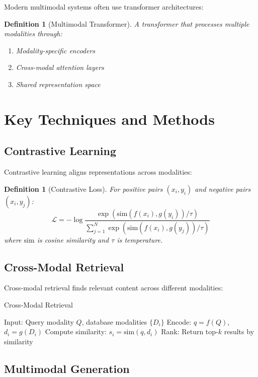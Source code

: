 \documentclass[11pt,a4paper]{article}
\newtheorem{definition}[theorem]{Definition}
\begin{document}
Modern multimodal systems often use transformer architectures:

\begin{definition}[Multimodal Transformer]
A transformer that processes multiple modalities through:
\begin{enumerate}
\item Modality-specific encoders
\item Cross-modal attention layers
\item Shared representation space
\end{enumerate}
\end{definition}

\section{Key Techniques and Methods}

\subsection{Contrastive Learning}

Contrastive learning aligns representations across modalities:

\begin{definition}[Contrastive Loss]
For positive pairs $(x_i, y_i)$ and negative pairs $(x_i, y_j)$:
$$\mathcal{L} = -\log \frac{\exp(\text{sim}(f(x_i), g(y_i))/\tau)}{\sum_{j=1}^N \exp(\text{sim}(f(x_i), g(y_j))/\tau)}$$
where $\text{sim}$ is cosine similarity and $\tau$ is temperature.
\end{definition}

\subsection{Cross-Modal Retrieval}

Cross-modal retrieval finds relevant content across different modalities:

\begin{algorithm}
\caption{Cross-Modal Retrieval}
\begin{algorithmic}[1]
\STATE Input: Query modality $Q$, database modalities $\{D_i\}$
\STATE Encode: $q = f(Q)$, $d_i = g(D_i)$
\STATE Compute similarity: $s_i = \text{sim}(q, d_i)$
\STATE Rank: Return top-$k$ results by similarity
\end{algorithmic}
\end{algorithm}

\subsection{Multimodal Generation}
\end{document}
